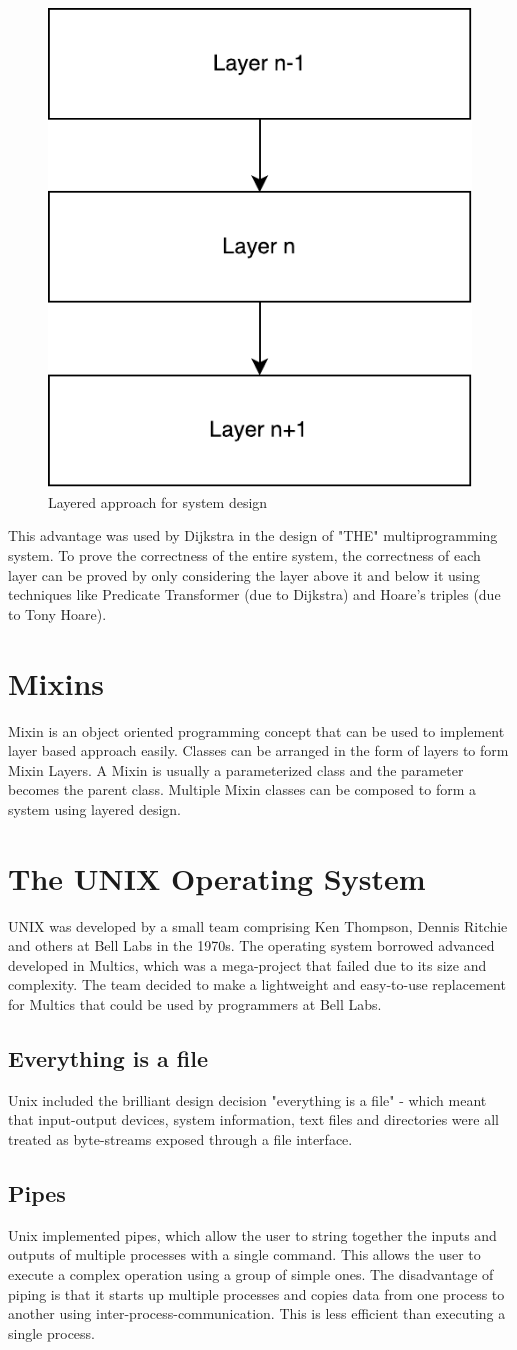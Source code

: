 \documentclass[twoside]{article}
\begin{document}
\begin{figure}[h!]
\centering
\includegraphics[width=0.2\linewidth]{layers.pdf}
\caption{Layered approach for system design}
\label{fig:layers}
\end{figure}

This advantage was used by Dijkstra in the design of "THE" multiprogramming system. To prove the correctness of the entire system, the correctness of each layer can be proved by only considering the layer above it and below it using techniques like Predicate Transformer (due to Dijkstra) and Hoare's triples (due to Tony Hoare).

\section{Mixins}

Mixin is an object oriented programming concept that can be used to implement layer based approach easily. Classes can be arranged in the form of layers to form Mixin Layers. A Mixin is usually a parameterized class and the parameter becomes the parent class. Multiple Mixin classes can be composed to form a system using layered design.

\section{The UNIX Operating System}

UNIX was developed by a small team comprising Ken Thompson, Dennis Ritchie and others at Bell Labs in the 1970s. The operating system borrowed advanced developed in Multics, which was a mega-project that failed due to its size and complexity. The team decided to make a lightweight and easy-to-use replacement for Multics that could be used by programmers at Bell Labs. 

\subsection{Everything is a file}
Unix included the brilliant design decision "everything is a file" - which meant that input-output devices, system information, text files and directories were all treated as byte-streams exposed through a file interface. 

\subsection{Pipes}
Unix implemented pipes, which allow the user to string together the inputs and outputs of multiple processes with a single command. This allows the user to execute a complex operation using a group of simple ones. The disadvantage of piping is that it starts up multiple processes and copies data from one process to another using inter-process-communication. This is less efficient than executing a single process.
\end{document}
